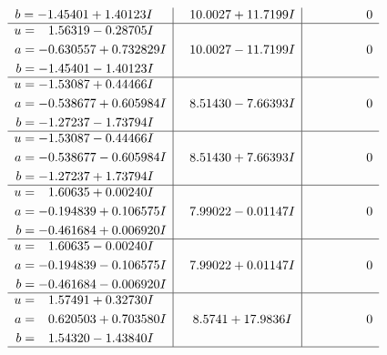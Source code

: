 \documentclass[1p]{elsarticle_modified}
\theoremstyle{definition}
\begin{document}
$$\begin{array}{c|c|c}
\begin{aligned}
b &= -1.45401 + 1.40123 I\end{aligned}
 & \phantom{-}10.0027 + 11.7199 I & \phantom{-0.000000 } 0 \\ \hline\begin{aligned}
u &= \phantom{-}1.56319 - 0.28705 I \\
a &= -0.630557 + 0.732829 I \\
b &= -1.45401 - 1.40123 I\end{aligned}
 & \phantom{-}10.0027 - 11.7199 I & \phantom{-0.000000 } 0 \\ \hline\begin{aligned}
u &= -1.53087 + 0.44466 I \\
a &= -0.538677 + 0.605984 I \\
b &= -1.27237 - 1.73794 I\end{aligned}
 & \phantom{-}8.51430 - 7.66393 I & \phantom{-0.000000 } 0 \\ \hline\begin{aligned}
u &= -1.53087 - 0.44466 I \\
a &= -0.538677 - 0.605984 I \\
b &= -1.27237 + 1.73794 I\end{aligned}
 & \phantom{-}8.51430 + 7.66393 I & \phantom{-0.000000 } 0 \\ \hline\begin{aligned}
u &= \phantom{-}1.60635 + 0.00240 I \\
a &= -0.194839 + 0.106575 I \\
b &= -0.461684 + 0.006920 I\end{aligned}
 & \phantom{-}7.99022 - 0.01147 I & \phantom{-0.000000 } 0 \\ \hline\begin{aligned}
u &= \phantom{-}1.60635 - 0.00240 I \\
a &= -0.194839 - 0.106575 I \\
b &= -0.461684 - 0.006920 I\end{aligned}
 & \phantom{-}7.99022 + 0.01147 I & \phantom{-0.000000 } 0 \\ \hline\begin{aligned}
u &= \phantom{-}1.57491 + 0.32730 I \\
a &= \phantom{-}0.620503 + 0.703580 I \\
b &= \phantom{-}1.54320 - 1.43840 I\end{aligned}
 & \phantom{-}8.5741 + 17.9836 I & \phantom{-0.000000 } 0\\
 \hline 
 \end{array}$$\newpage$$\begin{array}{c|c|c}  

\end{array}$$
\end{document}
